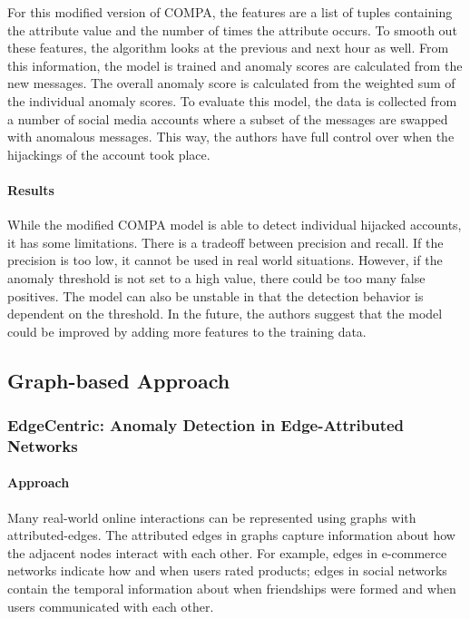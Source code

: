 \documentclass[11pt, oneside]{article}   	%
\begin{document}
\quad For this modified version of COMPA, the features are a list of tuples containing the attribute value and the number of times the attribute occurs.
To smooth out these features, the algorithm looks at the previous and next hour as well.
From this information, the model is trained and anomaly scores are calculated from the new messages.
The overall anomaly score is calculated from the weighted sum of the individual anomaly scores.
To evaluate this model, the data is collected from a number of social media accounts where a subset of the messages are swapped with anomalous messages.
This way, the authors have full control over when the hijackings of the account took place.

\paragraph{Results}
\quad

\quad While the modified COMPA model is able to detect individual hijacked accounts, it has some limitations.
There is a tradeoff between precision and recall.
If the precision is too low, it cannot be used in real world situations.
However, if the anomaly threshold is not set to a high value, there could be too many false positives.
The model can also be unstable in that the detection behavior is dependent on the threshold.
In the future, the authors suggest that the model could be improved by adding more features to the training data.

\subsection{Graph-based Approach}
\subsubsection{EdgeCentric: Anomaly Detection in Edge-Attributed Networks}

\paragraph{Approach}
\quad

\quad Many real-world online interactions can be represented using graphs with attributed-edges.
The attributed edges in graphs capture information about how the adjacent nodes interact with each other.
For example, edges in e-commerce networks indicate how and when users rated products; edges in social networks contain the temporal information about when friendships were formed and when users communicated with each other.
\end{document}
